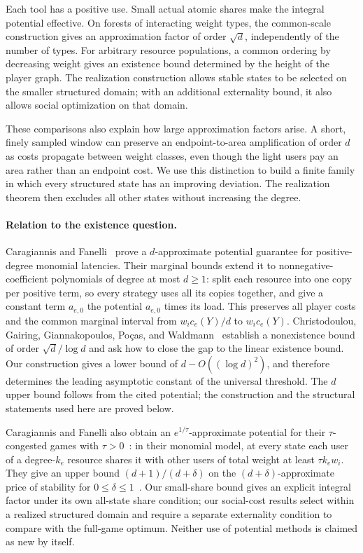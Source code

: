 \documentclass[manuscript,review,anonymous]{acmart}
\begin{document}
Each tool has a positive use. Small actual atomic shares make the integral potential effective. On forests of interacting weight types, the common-scale construction gives an approximation factor of order $\sqrt d$, independently of the number of types. For arbitrary resource populations, a common ordering by decreasing weight gives an existence bound determined by the height of the player graph. The realization construction allows stable states to be selected on the smaller structured domain; with an additional externality bound, it also allows social optimization on that domain.

These comparisons also explain how large approximation factors arise. A short, finely sampled window can preserve an endpoint-to-area amplification of order $d$ as costs propagate between weight classes, even though the light users pay an area rather than an endpoint cost. We use this distinction to build a finite family in which every structured state has an improving deviation. The realization theorem then excludes all other states without increasing the degree.

\paragraph{Relation to the existence question.}
Caragiannis and Fanelli~\cite[Theorem~2]{CF2021} prove a $d$-approximate potential guarantee for positive-degree monomial latencies. Their marginal bounds extend it to nonnegative-coefficient polynomials of degree at most $d\ge1$: split each resource into one copy per positive term, so every strategy uses all its copies together, and give a constant term $a_{e,0}$ the potential $a_{e,0}$ times its load. This preserves all player costs and the common marginal interval from $w_i c_e(Y)/d$ to $w_i c_e(Y)$. Christodoulou, Gairing, Giannakopoulos, Po\c{c}as, and Waldmann~\cite[Section~7]{CGGPW2023} establish a nonexistence bound of order $\sqrt d/\log d$ and ask how to close the gap to the linear existence bound. Our construction gives a lower bound of $d-O((\log d)^2)$, and therefore determines the leading asymptotic constant of the universal threshold. The $d$ upper bound follows from the cited potential; the construction and the structural statements used here are proved below.

Caragiannis and Fanelli also obtain an $e^{1/\tau}$-approximate potential for their $\tau$-congested games with $\tau>0$~\cite[Corollary~5]{CF2021}: in their monomial model, at every state each user of a degree-$k_e$ resource shares it with other users of total weight at least $\tau k_ew_i$. They give an upper bound $(d+1)/(d+\delta)$ on the $(d+\delta)$-approximate price of stability for $0\le\delta\le1$~\cite[Theorem~7]{CF2021}. Our small-share bound gives an explicit integral factor under its own all-state share condition; our social-cost results select within a realized structured domain and require a separate externality condition to compare with the full-game optimum. Neither use of potential methods is claimed as new by itself.
\end{document}
